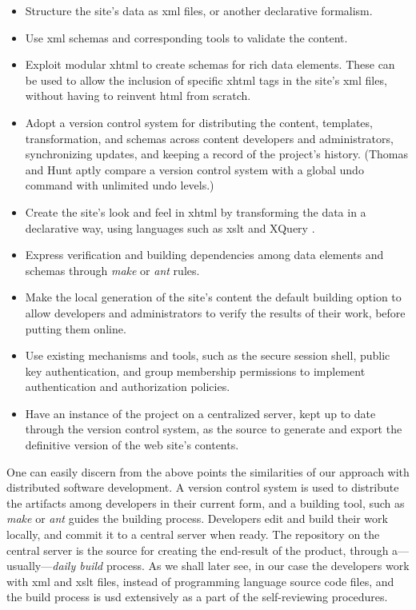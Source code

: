 \documentclass{article}
\begin{document}
\begin{itemize}
\item Structure the site's data as {\sc xml} files,
or another declarative formalism.
\item Use {\sc xml} schemas and corresponding tools to validate the content.
\item Exploit modular {\sc xhtml} \cite{W3C_MODULAR_XHTML} to create schemas for rich
data elements.
These can be used to allow the inclusion of specific {\sc xhtml} tags
in the site's {\sc xml} files, without having to reinvent {\sc html}
from scratch.
\item Adopt a version control system for distributing the content,
templates, transformation, and schemas across content developers and
administrators, synchronizing updates, and keeping a record of the project's history.
(Thomas and Hunt \cite{HT00} aptly compare a version control system
with a global undo command with unlimited undo levels.)
\item Create the site's look and feel in {\sc xhtml} by transforming
the data in a declarative way, using languages such as {\sc xslt} and XQuery \cite{HM01,NOV03}.
\item Express verification and building dependencies among
data elements and schemas through {\em make} \cite{MAKE} or {\em ant}
\cite{JAKARTA_ANT} rules.
\item Make the local generation of the site's content the default
building option to allow developers and administrators to verify
the results of  their work, before putting them online.
\item Use existing mechanisms and tools, such as the secure session shell,
public key authentication, and group membership permissions to implement
authentication and authorization policies.
\item Have an instance of the project on a centralized server, kept up to
date through the version control system, as the source to generate and export
the definitive version of the web site's contents.
\end{itemize}

One can easily discern from the above points the similarities of our
approach with distributed software development.
A version control system is used to distribute the artifacts among
developers in their current form, and a building tool, such as {\em make}
or {\em ant} guides the building process.
Developers edit and build their work locally, and commit it to a central server when ready.
The repository on the central server is the source for creating the end-result
of the product, through a---usually---{\em daily build} process.
As we shall later see, in our case the developers work with {\sc xml} and {\sc xslt}
files, instead of programming language source code files, and the build process
is usd extensively as a part of the self-reviewing procedures.
\end{document}
